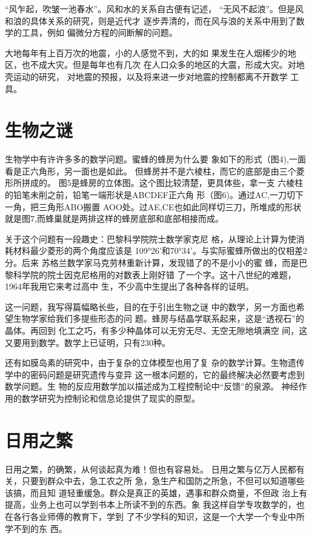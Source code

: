 \documentclass[twoside,openright,headings=optiontohead]{ctexbook} %
\begin{document}
{``风乍起，吹皱一池春水''。风和水的关系自古便有记述，
``无风不起浪''。但是风和浪的具体关系的研究，则是近代才
逐步弄清的，而在风与浪的关系中用到了数学的工具，例如
偏微分方程的间断解的问题。

大地每年有上百万次的地震，小的人感觉不到，大的如
果发生在人烟稀少的地区，也不成大灾。但是每年也有几次
在人口众多的地区的大震，形成大灾。对地壳运动的研究，
对地震的预报，以及将来进一步对地震的控制都离不开数学 工具。

\section{生物之谜}\label{ux751fux7269ux4e4bux8c1c}

生物学中有许许多多的数学问题。蜜蜂的蜂房为什么要
象如下的形式（图4),一面看是正六角形，另一面也是如此。
但蜂房并不是六棱柱，而它的底部是由三个菱形所拼成的。
图5是蜂房的立体图。这个图比较清楚，更具体些，拿一支
六棱柱的铅笔未削之前，铅笔一端形状是ABCDEF正六角
形（图6)。通过AC,一刀切下一角，把三角形ABO搬置
AOO处。过AE,CE也如此同样切三刀，所堆成的形状
就是图7,而蜂巢就是两排这样的蜂房底部和底部相接而成。

关于这个问题有一段趣史：巴黎科学院院士数学家克尼
格，从理论上计算为使消耗材料最少菱形的两个角度应该是
109°26'和70°34'。与实际蜜蜂所做出的仅相差2分。后来
苏格兰数学家马克劳林重新计算，发现错了的不是小小的蜜
蜂，而是巴黎科学院的院士因克尼格用的对数表上刚好错
了一个字。这十八世纪的难题，1964年我用它来考过高中
生，不少高中生提出了各种各样的证明。

这一问题，我写得篇幅略长些，目的在于引出生物之谜
中的数学，另一方面也希望生物学家给我们多提些形态的问
题。蜂房与结晶学联系起来，这是``透视石''的晶体。再回到
化工之巧，有多少种晶体可以无穷无尽、无空无隙地填满空
间，这又要用到数学。数学上已证明，只有230种。

还有如膜岛素的研究中，由于复杂的立体模型也用了复
杂的数学计算。生物遗传学中的密码问题是研究遗传与变异
这一根本问题的，它的最终解决必然要考虑到数学问题。生
物的反应用数学加以描述成为工程控制论中``反馈''的泉源。
神经作用的数学研究为控制论和信息论提供了现实的原型。

\section{日用之繁}\label{ux65e5ux7528ux4e4bux7e41}

日用之繁，的确繁，从何谈起真为难！但也有容易处。
日用之繁与亿万人民都有关，只要到群众中去，急工农之所
急，急生产和国防之所急，不但可以知道哪些该搞，而且知
道轻重缓急。群众是真正的英雄，遇事和群众商量，不但政
治上有提高，业务上也可以学到书本上所读不到的东西。象
我这样自学专攻数学的，也在各行各业师傅的教育下，学到
了不少学科的知识，这是一个大学一个专业中所学不到的东 西。

}
\end{document}
